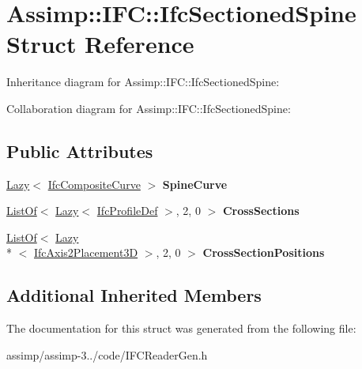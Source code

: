 \hypertarget{struct_assimp_1_1_i_f_c_1_1_ifc_sectioned_spine}{\section{Assimp\+:\+:I\+F\+C\+:\+:Ifc\+Sectioned\+Spine Struct Reference}
\label{struct_assimp_1_1_i_f_c_1_1_ifc_sectioned_spine}
}


Inheritance diagram for Assimp\+:\+:I\+F\+C\+:\+:Ifc\+Sectioned\+Spine\+:


Collaboration diagram for Assimp\+:\+:I\+F\+C\+:\+:Ifc\+Sectioned\+Spine\+:
\subsection*{Public Attributes}
\begin{DoxyCompactItemize}
\item 
\hypertarget{struct_assimp_1_1_i_f_c_1_1_ifc_sectioned_spine_af0712b14ee5f0b30e5ec83b7d599f4d4}{\hyperlink{struct_assimp_1_1_s_t_e_p_1_1_lazy}{Lazy}$<$ \hyperlink{struct_assimp_1_1_i_f_c_1_1_ifc_composite_curve}{Ifc\+Composite\+Curve} $>$ {\bfseries Spine\+Curve}}\label{struct_assimp_1_1_i_f_c_1_1_ifc_sectioned_spine_af0712b14ee5f0b30e5ec83b7d599f4d4}

\item 
\hypertarget{struct_assimp_1_1_i_f_c_1_1_ifc_sectioned_spine_a3da98f4f869897f40cfd29c328274832}{\hyperlink{struct_assimp_1_1_s_t_e_p_1_1_list_of}{List\+Of}$<$ \hyperlink{struct_assimp_1_1_s_t_e_p_1_1_lazy}{Lazy}$<$ \hyperlink{struct_assimp_1_1_i_f_c_1_1_ifc_profile_def}{Ifc\+Profile\+Def} $>$, 2, 0 $>$ {\bfseries Cross\+Sections}}\label{struct_assimp_1_1_i_f_c_1_1_ifc_sectioned_spine_a3da98f4f869897f40cfd29c328274832}

\item 
\hypertarget{struct_assimp_1_1_i_f_c_1_1_ifc_sectioned_spine_a68f46efcb42efbd03d89bd7fb8b16ad1}{\hyperlink{struct_assimp_1_1_s_t_e_p_1_1_list_of}{List\+Of}$<$ \hyperlink{struct_assimp_1_1_s_t_e_p_1_1_lazy}{Lazy}\\*
$<$ \hyperlink{struct_assimp_1_1_i_f_c_1_1_ifc_axis2_placement3_d}{Ifc\+Axis2\+Placement3\+D} $>$, 2, 0 $>$ {\bfseries Cross\+Section\+Positions}}\label{struct_assimp_1_1_i_f_c_1_1_ifc_sectioned_spine_a68f46efcb42efbd03d89bd7fb8b16ad1}

\end{DoxyCompactItemize}
\subsection*{Additional Inherited Members}


The documentation for this struct was generated from the following file\+:\begin{DoxyCompactItemize}
\item 
assimp/assimp-\/3../code/I\+F\+C\+Reader\+Gen.\+h\end{DoxyCompactItemize}
